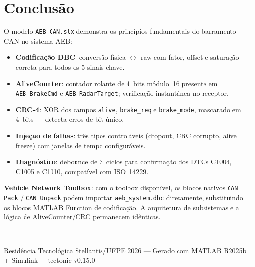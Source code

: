 \documentclass[12pt,a4paper]{article}
\begin{document}
\section{Conclusão}
\label{sec:conclusao}

O modelo \texttt{AEB\_CAN.slx} demonstra os princípios fundamentais do
barramento CAN no sistema AEB:

\begin{itemize}[leftmargin=1.5em]
  \item \textbf{Codificação DBC}: conversão física $\leftrightarrow$ raw
    com fator, offset e saturação correta para todos os 5 sinais-chave.
  \item \textbf{AliveCounter}: contador rolante de 4~bits módulo~16 presente
    em \texttt{AEB\_BrakeCmd} e \texttt{AEB\_RadarTarget}; verificação
    instantânea no receptor.
  \item \textbf{CRC-4}: XOR dos campos \texttt{alive}, \texttt{brake\_req}
    e \texttt{brake\_mode}, mascarado em 4~bits --- detecta erros de bit único.
  \item \textbf{Injeção de falhas}: três tipos controláveis (dropout, CRC
    corrupto, alive freeze) com janelas de tempo configuráveis.
  \item \textbf{Diagnóstico}: debounce de 3~ciclos para confirmação dos
    DTCs C1004, C1005 e C1010, compatível com ISO~14229.
\end{itemize}

\begin{tcolorbox}[notabox]
  \textbf{Vehicle Network Toolbox}: com o toolbox disponível, os blocos
  nativos \texttt{CAN Pack} / \texttt{CAN Unpack} podem importar
  \texttt{aeb\_system.dbc} diretamente, substituindo os blocos
  MATLAB Function de codificação. A arquitetura de subsistemas e a lógica
  de AliveCounter/CRC permanecem idênticas.
\end{tcolorbox}

\vspace{1cm}
\noindent\rule{\linewidth}{0.4pt}\\[0.2cm]
{\small\color{cinza}
Residência Tecnológica Stellantis/UFPE 2026 ---
Gerado com MATLAB R2025b + Simulink + tectonic v0.15.0}
\end{document}
